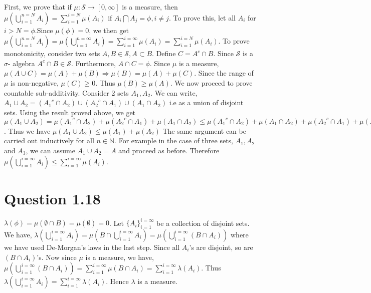 \documentclass{article}
\begin{document}
    First, we prove that if $\mu: \mathcal{S} \rightarrow [0, \infty]$ is a measure, then $\mu(\bigcup_{i=1}^{n=N}A_i) = \sum_{i=1}^{i=N}\mu(A_i)$ if $A_i \bigcap A_j = \phi, i \ne j$. 
    \newline
    \newline
    To prove this, let all $A_i$ for $i > N = \phi$.Since $\mu(\phi)= 0$, we then get $\mu(\bigcup_{i=1}^{n=N}A_i) = \mu(\bigcup_{i=1}^{n=\infty}A_i) = \sum_{i=1}^{i=\infty}\mu(A_i) = \sum_{i=1}^{i=N}\mu(A_i)$.
   \newline
    \newline
    To prove monotonicity, consider two sets $A, B \in \mathcal{S}, A \subset B$. Define $C = A^c \cap B$. Since $\mathcal{S}$ is a $\sigma$- algebra
    $A^c \cap B \in \mathcal{S}$. Furthermore, $A \cap C = \phi$. Since $\mu$ is a measure, $\mu(A \cup C) = \mu(A) + \mu(B) \Rightarrow
    \mu(B) = \mu(A) + \mu(C)$. Since the range of $\mu$ is non-negative, $\mu(C) \ge 0$. Thus $\mu(B) \ge \mu(A)$.
    \newline
    \newline
    We now proceed to prove countable sub-additivity. Consider 2 sets $A_1, A_2$. We can write, $A_1 \cup A_2 = ({A_1}^c \cap A_2) \cup ({A_2}^c \cap A_1) \cup (A_1 \cap A_2)$
    i.e as a union of disjoint sets. Using the result proved above, we get $\mu(A_1 \cup A_2) = \mu({A_1}^c \cap A_2) + \mu({A_2}^c \cap A_1) + \mu(A_1 \cap A_2)
    \le \mu({A_1}^c \cap A_2) + \mu(A_1 \cap A_2) + \mu({A_2}^c \cap A_1) + \mu(A_1 \cap A_2) = \mu(A_1) + \mu(A_2)$. Thus we have $\mu (A_1 \cup A_2) \le \mu(A_1) + \mu(A_2)$
    \newline
    \newline
    The same argument can be carried out inductively for all $n \in \mathbb{N}$. For example in the case of three sets, $A_1, A_2$ and $A_3$, we can assume $A_1 \cup A_2 = A$
    and proceed as before. Therefore $\mu(\bigcup_{i=1}^{i=\infty}A_i) \le \sum_{i=1}^{i=\infty}\mu(A_i)$.


  \section*{Question 1.18}
    $\lambda(\phi) = \mu(\emptyset \cap B) = \mu(\emptyset) = 0$. Let $\{A_i\}_{i=1}^{i= \infty}$ be a collection of disjoint sets.
    We have, $\lambda(\bigcup_{i=1}^{i = \infty}A_i) = \mu(B \cap \bigcup_{i=1}^{i = \infty}A_i) = \mu(\bigcup_{i=1}^{i=\infty}(B \cap A_i))$ where we have used De-Morgan's laws in the last step.
    Since all $A_i$'s are disjoint, so are $(B\cap A_i)$'s. Now since $\mu$ is a measure, we have, $\mu(\bigcup_{i=1}^{i=\infty}(B \cap A_i))  = \sum_{i=1}^{i=\infty}\mu(B \cap A_i) =
    \sum_{i=1}^{i=\infty} \lambda(A_i)$. Thus $\lambda(\bigcup_{i=1}^{i = \infty}A_i) = \sum_{i=1}^{i=\infty} \lambda(A_i)$. Hence $\lambda$ is a measure.
\end{document}
